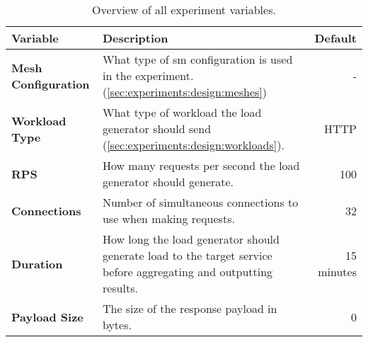 \begin{table*}[!t]
\centering

\begin{tabularx}{\textwidth}{l X r}

\toprule
\textbf{Variable}    &
\textbf{Description} &
\textbf{Default}     \\
\toprule

\textbf{Mesh Configuration} &
What type of \gls{sm} configuration is used in the experiment. (\cref{sec:experiments:design:meshes}) &
- \\

\textbf{Workload Type} &
What type of workload the load generator should send (\cref{sec:experiments:design:workloads}). &
HTTP \\

\textbf{RPS} &
How many requests per second the load generator should generate. &
100 \\

\textbf{Connections} &
Number of simultaneous connections to use when making requests. &
32 \\

\textbf{Duration} &
How long the load generator should generate load to the target service before aggregating and outputting results. &
15 minutes \\

\textbf{Payload Size} &
The size of the response payload in bytes. &
0 \\

\bottomrule

\end{tabularx}

\caption{Overview of all experiment variables.}
\label{tab:experiment:design:exp-variables}
\end{table*}
